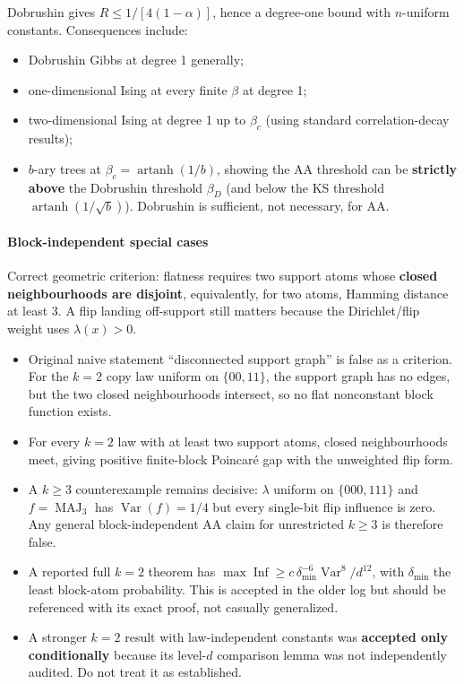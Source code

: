 Dobrushin gives \(R\le1/[4(1-\alpha)]\), hence a degree-one bound with \(n\)-uniform constants. Consequences include:

\begin{itemize}
\tightlist
\item
  Dobrushin Gibbs at degree 1 generally;
\item
  one-dimensional Ising at every finite \(\beta\) at degree 1;
\item
  two-dimensional Ising at degree 1 up to \(\beta_c\) (using standard correlation-decay results);
\item
  \(b\)-ary trees at \(\beta_c=\operatorname{artanh}(1/b)\), showing the AA threshold can be \textbf{strictly above} the Dobrushin threshold \(\beta_D\) (and below the KS threshold \(\operatorname{artanh}(1/\sqrt b)\)). Dobrushin is sufficient, not necessary, for AA.
\end{itemize}

\paragraph{Block-independent special cases}\label{block-independent-special-cases}

Correct geometric criterion: flatness requires two support atoms whose \textbf{closed neighbourhoods are disjoint}, equivalently, for two atoms, Hamming distance at least 3. A flip landing off-support still matters because the Dirichlet/flip weight uses \(\lambda(x)>0\).

\begin{itemize}
\tightlist
\item
  Original naive statement ``disconnected support graph'' is false as a criterion. For the \(k=2\) copy law uniform on \(\{00,11\}\), the support graph has no edges, but the two closed neighbourhoods intersect, so no flat nonconstant block function exists.
\item
  For every \(k=2\) law with at least two support atoms, closed neighbourhoods meet, giving positive finite-block Poincaré gap with the unweighted flip form.
\item
  A \(k\ge3\) counterexample remains decisive: \(\lambda\) uniform on \(\{000,111\}\) and \(f=\operatorname{MAJ}_3\) has \(\operatorname{Var}(f)=1/4\) but every single-bit flip influence is zero. Any general block-independent AA claim for unrestricted \(k\ge3\) is therefore false.
\item
  A reported full \(k=2\) theorem has
  \(\max\operatorname{Inf}\ge c\,\delta_{\min}^{-6}\operatorname{Var}^8/d^{12}\),
  with \(\delta_{\min}\) the least block-atom probability. This is accepted in the older log but should be referenced with its exact proof, not casually generalized.
\item
  A stronger \(k=2\) result with law-independent constants was \textbf{accepted only conditionally} because its level-\(d\) comparison lemma was not independently audited. Do not treat it as established.
\end{itemize}

